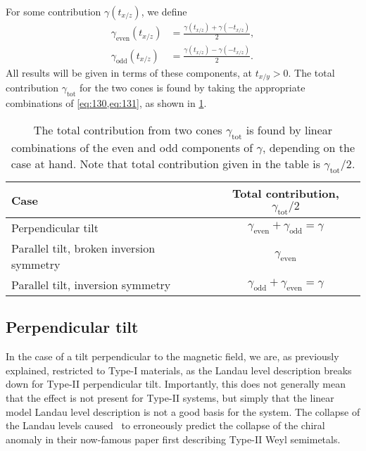 For some contribution \( \gamma(t_{x /z}) \), we define
\begin{align}
  \gamma_{\text{even}}(t_{x/z}) &= \frac{\gamma(t_{x/z}) + \gamma(-t_{x/z})}{2}\label{eq:130},\\
  \gamma_{\text{odd}}(t_{x/z}) &= \frac{\gamma(t_{x/z}) - \gamma(-t_{x/z})}{2}\label{eq:131}.
\end{align}
All results will be given in terms of these components, at \( t_{x /y} > 0 \).
The total contribution \( \gamma_{\text{tot}} \) for the two cones is found by taking the appropriate combinations of \cref{eq:130,eq:131}, as shown in \cref{tab:gamma-tot}.

\begin{table}[h]
  \centering
  \caption{The total contribution from two cones \( \gamma_{\text{tot}} \) is found by linear combinations of the even and odd components of \( \gamma \), depending on the case at hand.
    Note that total contribution given in the table is \( \gamma_{\text{tot}} /2 \).%
    \label{tab:gamma-tot}}
  \begin{tabular}{l c}
    \toprule
    Case & Total contribution, \( \gamma_{\text{tot}} /2 \)\\
    \midrule
    Perpendicular tilt & \( \gamma_{\text{even}} + \gamma_{\text{odd}} = \gamma \)\\
    Parallel tilt, broken inversion symmetry & \( \gamma_{\text{even}} \)\\
    Parallel tilt, inversion symmetry &  \(  \gamma_{\text{odd}} + \gamma_{\text{even}} = \gamma \)\\\bottomrule
  \end{tabular}
\end{table}

\subsection{Perpendicular tilt}
In the case of a tilt perpendicular to the magnetic field, we are, as previously explained, restricted to Type-I materials, as the Landau level description breaks down for Type-II perpendicular tilt.
Importantly, this does not generally mean that the effect is not present for Type-II systems, but simply that the linear model Landau level description is not a good basis for the system.
The collapse of the Landau levels caused~\textcite{soluyanovTypeIIWeylSemimetals2015} to erroneously predict the collapse of the chiral anomaly in their now-famous paper first describing Type-II Weyl semimetals.

